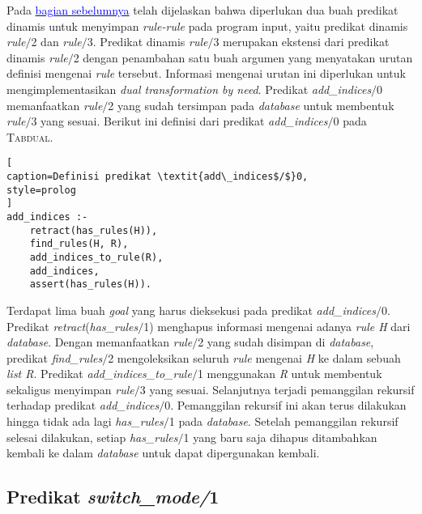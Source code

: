Pada \hyperref[rule2to3]{\textcolor{blue}{bagian sebelumnya}} telah dijelaskan bahwa diperlukan dua buah predikat dinamis untuk menyimpan \textit{rule-rule} pada program input, yaitu predikat dinamis \textit{rule$/$}2 dan \textit{rule$/$}3. Predikat dinamis \textit{rule$/$}3 merupakan ekstensi dari predikat dinamis \textit{rule$/$}2 dengan penambahan satu buah argumen yang menyatakan urutan definisi mengenai \textit{rule} tersebut. Informasi mengenai urutan ini diperlukan untuk mengimplementasikan \textit{dual transformation by need}. Predikat \textit{add\_indices$/$}0 memanfaatkan \textit{rule$/$}2 yang sudah tersimpan pada \textit{database} untuk membentuk \textit{rule$/$}3 yang sesuai. Berikut ini definisi dari predikat \textit{add\_indices$/$}0 pada \textsc{Tabdual}.
\\

\begin{lstlisting}[
caption=Definisi predikat \textit{add\_indices$/$}0,
style=prolog
]
add_indices :-
	retract(has_rules(H)),
	find_rules(H, R),
	add_indices_to_rule(R),
	add_indices,
	assert(has_rules(H)).
\end{lstlisting}

Terdapat lima buah \textit{goal} yang harus dieksekusi pada predikat \textit{add\_indices$/$}0. Predikat \textit{retract}(\textit{has\_rules$/$}1) menghapus informasi mengenai adanya \textit{rule H} dari \textit{database}. Dengan memanfaatkan \textit{rule$/$}2 yang sudah disimpan di \textit{database}, predikat \textit{find\_rules$/$}2 mengoleksikan seluruh \textit{rule} mengenai \textit{H} ke dalam sebuah \textit{list R}. Predikat \textit{add\_indices\_to\_rule$/$}1 menggunakan \textit{R} untuk membentuk sekaligus menyimpan \textit{rule$/$}3 yang sesuai. Selanjutnya terjadi pemanggilan rekursif terhadap predikat \textit{add\_indices$/$}0. Pemanggilan rekursif ini akan terus dilakukan hingga tidak ada lagi \textit{has\_rules$/$}1 pada \textit{database}. Setelah pemanggilan rekursif selesai dilakukan, setiap \textit{has\_rules$/$}1 yang baru saja dihapus ditambahkan kembali ke dalam \textit{database} untuk dapat dipergunakan kembali.

\label{subsec:mode}
\subsection{Predikat \textit{switch\_mode/}1}

